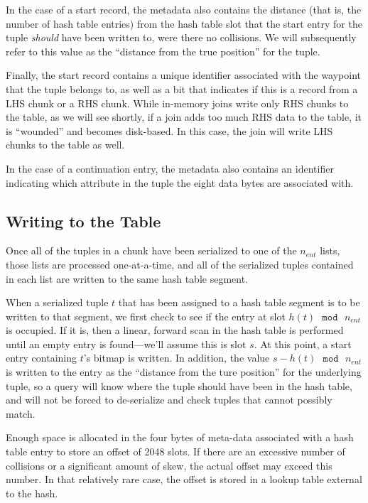 \documentclass{sig-alternate}
\renewcommand\:{\colon} %
\begin{document}
In the case of a start record, the metadata also contains the distance (that is, the number of hash table 
entries) from the hash table slot that the start entry 
for the tuple \emph{should} have been written to, were there no collisions.
We will subsequently refer to this value as the ``distance from the true position'' for the tuple.

Finally, the start record contains a unique identifier associated with the waypoint that the tuple belongs to,
as well as a bit that indicates if this is a record from a LHS chunk or a RHS chunk.  While in-memory joins write only
RHS chunks to the table, as we will see shortly, if
a join adds too much RHS data to the table, it is ``wounded'' and becomes disk-based.  In this case, the join will
write LHS chunks to the table as well.

In the case of a continuation entry, the metadata also contains an identifier indicating which attribute in the tuple
the eight data bytes are associated with.

\subsection{Writing to the Table}

Once all of the tuples in a chunk have been serialized to one of the $n_{ent}$ lists, those
lists are processed one-at-a-time, and all of the serialized tuples contained in each list are written to the same
hash table segment.
 
When a serialized tuple $t$ that has been assigned to a hash table segment is to be written
to that segment, we first check to see if the entry at slot 
$h(t) \textrm{ }\texttt{mod}\textrm{ }n_{ent}$ is occupied.  If it is, then a linear, forward scan in the hash table
is performed until an empty entry is found---we'll assume this is slot $s$.  
At this point, a start entry containing $t$'s bitmap is written.  In
addition, the value $s - h(t) \textrm{ }\texttt{mod}\textrm{ }n_{ent}$ is written to the entry as the ``distance from the
ture position'' for the underlying tuple, so a query
will know where the tuple should have been in the hash table, and
will not be forced to de-serialize and check tuples that cannot possibly match.

Enough space is allocated in the four bytes of meta-data associated with a hash table entry to store an offset of
2048 slots.  If there are an excessive number of collisions or a significant amount of skew, the actual offset may
exceed this number.  In that relatively rare case, the offset is stored in a lookup table external 
to the hash.
\end{document}
